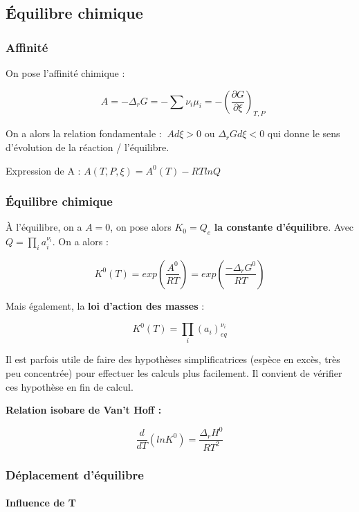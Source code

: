 \documentclass[9pt,twocolumn]{article}
\begin{document}
\setlength{\columnseprule}{0.1pt}
\begin{center}
\part*{Équilibre chimique}
\end{center}
\section{Affinité}
On pose l'affinité chimique  : 

$$\>\>\>\boxed{A=-\Delta_rG=-\sum \nu_i \mu_i=-\left(\dfrac{\partial G}{\partial\xi}\right)_{T,P}}$$
\bigbreak

On a alors la relation fondamentale : $\>\boxed{Ad\xi>0}$ ou $\boxed{\Delta_rGd\xi<0}$ qui donne le sens d'évolution de la réaction / l'équilibre.

\bigbreak 
Expression de A : $\boxed{A(T,P,\xi)=A^0(T)-RT ln Q}$

\section{Équilibre chimique}

À l'équilibre, on a $A=0$, on pose alors $K_0=Q_e$ \textbf{la constante d'équilibre}. Avec $Q=\prod_i a_i^{\nu_i}$. On a alors :

$$\boxed{K^0(T) = exp \left( \dfrac{A^0}{RT} \right)= exp \left( \dfrac{-\Delta_rG^0}{RT} \right)}$$

Mais également, la \textbf{loi d'action des masses} :

$$\boxed{K^0(T)=\prod_i (a_i)_{eq}^{\nu_i}}$$

Il est parfois utile de faire des hypothèses simplificatrices (espèce en excès, très peu concentrée) pour effectuer les calculs plus facilement. Il convient de vérifier ces hypothèse en fin de calcul.
\bigbreak

\textbf{Relation isobare de Van't Hoff :}

$$\boxed{\dfrac{d}{dT}(ln K^0)=\dfrac{\Delta_rH^0}{RT^2}}$$

\section{Déplacement d'équilibre}

\subsection{Influence de T}
\end{document}
